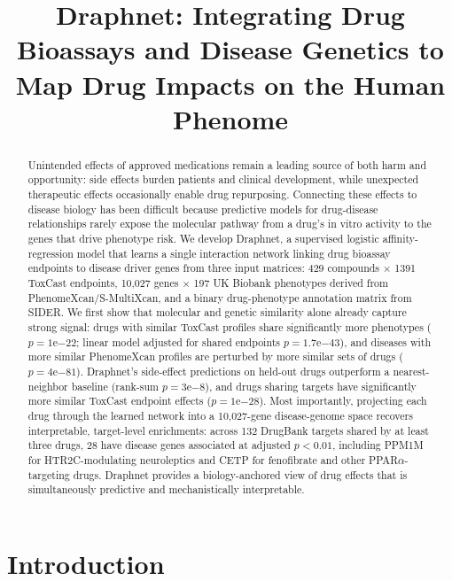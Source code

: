 \documentclass[11pt]{article}
\title{Draphnet: Integrating Drug Bioassays and Disease Genetics to Map Drug
Impacts on the Human Phenome}
\author{}
\date{}
\begin{document}
\maketitle

\begin{abstract}
Unintended effects of approved medications remain a leading source of
both harm and opportunity: side effects burden patients and clinical
development, while unexpected therapeutic effects occasionally enable drug
repurposing. Connecting these effects to disease biology has been
difficult because predictive models for drug-disease relationships rarely
expose the molecular pathway from a drug's in vitro activity to the genes
that drive phenotype risk. We develop Draphnet, a supervised logistic
affinity-regression model that learns a single interaction network
linking drug bioassay endpoints to disease driver genes from three input
matrices: 429 compounds $\times$ 1391 ToxCast endpoints, 10,027 genes
$\times$ 197 UK Biobank phenotypes derived from PhenomeXcan/S-MultiXcan,
and a binary drug-phenotype annotation matrix from SIDER. We first show
that molecular and genetic similarity alone already capture strong
signal: drugs with similar ToxCast profiles share significantly more
phenotypes ($p=1\mathrm{e}{-22}$; linear model adjusted for shared
endpoints $p=1.7\mathrm{e}{-43}$), and diseases with more similar
PhenomeXcan profiles are perturbed by more similar sets of drugs
($p=4\mathrm{e}{-81}$). Draphnet's side-effect predictions on held-out
drugs outperform a nearest-neighbor baseline (rank-sum
$p=3\mathrm{e}{-8}$), and drugs sharing targets have significantly more
similar ToxCast endpoint effects ($p=1\mathrm{e}{-28}$). Most
importantly, projecting each drug through the learned network into a
10,027-gene disease-genome space recovers interpretable, target-level
enrichments: across 132 DrugBank targets shared by at least three drugs,
28 have disease genes associated at adjusted $p<0.01$, including PPM1M
for HTR2C-modulating neuroleptics and CETP for fenofibrate and other
PPAR$\alpha$-targeting drugs. Draphnet provides a biology-anchored view
of drug effects that is simultaneously predictive and mechanistically
interpretable.
\end{abstract}

\section{Introduction}
\end{document}
